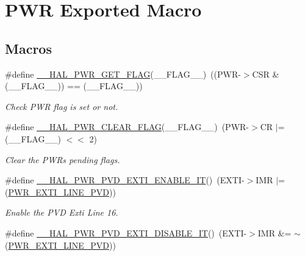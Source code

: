 \hypertarget{group___p_w_r___exported___macro}{}\section{P\+WR Exported Macro}
\label{group___p_w_r___exported___macro}
\subsection*{Macros}
\begin{DoxyCompactItemize}
\item 
\#define \hyperlink{group___p_w_r___exported___macro_ga2977135bbea35b786805eea640d1c884}{\+\_\+\+\_\+\+H\+A\+L\+\_\+\+P\+W\+R\+\_\+\+G\+E\+T\+\_\+\+F\+L\+AG}(\+\_\+\+\_\+\+F\+L\+A\+G\+\_\+\+\_\+)~((P\+WR-\/$>$C\+SR \& (\+\_\+\+\_\+\+F\+L\+A\+G\+\_\+\+\_\+)) == (\+\_\+\+\_\+\+F\+L\+A\+G\+\_\+\+\_\+))
\begin{DoxyCompactList}\small\item\em Check P\+WR flag is set or not. \end{DoxyCompactList}\item 
\#define \hyperlink{group___p_w_r___exported___macro_ga96f24bf4b16c9f944cd829100bf746e5}{\+\_\+\+\_\+\+H\+A\+L\+\_\+\+P\+W\+R\+\_\+\+C\+L\+E\+A\+R\+\_\+\+F\+L\+AG}(\+\_\+\+\_\+\+F\+L\+A\+G\+\_\+\+\_\+)~(P\+WR-\/$>$CR $\vert$=  (\+\_\+\+\_\+\+F\+L\+A\+G\+\_\+\+\_\+) $<$$<$ 2)
\begin{DoxyCompactList}\small\item\em Clear the P\+WR\textquotesingle{}s pending flags. \end{DoxyCompactList}\item 
\#define \hyperlink{group___p_w_r___exported___macro_ga3180f039cf14ef78a64089f387f8f9c2}{\+\_\+\+\_\+\+H\+A\+L\+\_\+\+P\+W\+R\+\_\+\+P\+V\+D\+\_\+\+E\+X\+T\+I\+\_\+\+E\+N\+A\+B\+L\+E\+\_\+\+IT}()~(E\+X\+TI-\/$>$I\+MR $\vert$= (\hyperlink{group___p_w_r___p_v_d___e_x_t_i___line_ga43a49255649e03d2d2b6b12c5c379d2b}{P\+W\+R\+\_\+\+E\+X\+T\+I\+\_\+\+L\+I\+N\+E\+\_\+\+P\+VD}))
\begin{DoxyCompactList}\small\item\em Enable the P\+VD Exti Line 16. \end{DoxyCompactList}\item 
\#define \hyperlink{group___p_w_r___exported___macro_gad240d7bf8f15191b068497b9aead1f1f}{\+\_\+\+\_\+\+H\+A\+L\+\_\+\+P\+W\+R\+\_\+\+P\+V\+D\+\_\+\+E\+X\+T\+I\+\_\+\+D\+I\+S\+A\+B\+L\+E\+\_\+\+IT}()~(E\+X\+TI-\/$>$I\+MR \&= $\sim$(\hyperlink{group___p_w_r___p_v_d___e_x_t_i___line_ga43a49255649e03d2d2b6b12c5c379d2b}{P\+W\+R\+\_\+\+E\+X\+T\+I\+\_\+\+L\+I\+N\+E\+\_\+\+P\+VD}))
$$
\end{DoxyCompactItemize}
